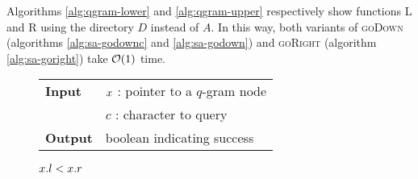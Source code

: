 Algorithms \ref{alg:qgram-lower} and \ref{alg:qgram-upper} respectively show functions \textsc{L} and \textsc{R} using the directory $D$ instead of $A$.
In this way, both variants of \textsc{goDown} (algorithms \ref{alg:sa-godownc} and \ref{alg:sa-godown}) and \textsc{goRight} (algorithm \ref{alg:sa-goright}) take $\mathcal{O}(1)$ time.

\begin{figure*}
\begin{center}
\begin{minipage}[t]{.6\textwidth}
\begin{algorithm}[H]
\begin{tabular}{ll}
\textbf{Input}  & $x$ : pointer to a $q$-gram node\\
				& $c$ : character to query\\
\textbf{Output} & boolean indicating success\\
\end{tabular}
\begin{algorithmic}[1]
	\State \Return \False
\EndIf
{}
\State \Return $x.l < x.r$
\end{algorithmic}
\label{alg:qgram-godownc}
\end{algorithm}
\end{minipage}
\end{center}
\end{figure*}



